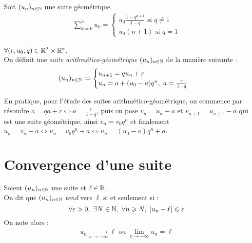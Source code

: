 \begin{proposition}
    Soit $(u_n)_{n \in \mathbb{N}}$ une suite géométrique.
    \begin{align*}
        \sum_{k = 0}^{n} u_k = 
        \begin{cases}
            u_0 \frac{1 - q^{n+1}}{1 - q} \text{ si } q \neq 1\\
            u_0(n+1) \text{ si } q = 1
        \end{cases}
    \end{align*}
\end{proposition}

\begin{definition}
    $\forall (r, u_0, q) \in \mathbb{R}^2 \times \mathbb{R}^*$. 
    \\
    On définit une \emph{suite arithmético-géométrique} $(u_n)_{n \in \mathbb{N}}$ de la manière suivante :
    \begin{align*}
        (u_n)_{n \in \mathbb{N}} \coloneqq 
        \begin{cases}
            u_{n+1} = qu_n + r \\ 
            u_n = a + (u_0 - a) q^n,\ a = \frac{r}{1 - q}
        \end{cases}
    \end{align*}
\end{definition}

En pratique, pour l'étude des suites arithmético-géométrique, on commence par résoudre $a = qa + r \iff a = \frac{r}{1 - q}$, puis on pose $v_n = u_n - a$ et $v_{n+1} = u_{n+1} - a$ qui est une suite géométrique, ainsi $v_n = v_0 q^n$ et finalement $u_n = v_n + a \iff u_n = v_0 q^n + a \iff u_n = (u_0 - a) q^n + a$.

\section{Convergence d'une suite}
\begin{definition}
    Soient $(u_n)_{n \in \mathbb{N}}$ une suite et $\ell \in \mathbb{R}$. 
    \\
    On dit que $(u_n)_{n \in \mathbb{N}}$ \emph{tend} vers $\ell$ si et seulement si :
    \[ \forall \varepsilon > 0,\ \exists N \in \mathbb{N},\ \forall n \geqslant N,\ \abs{u_n - \ell} \leqslant \varepsilon \]
    On note alors :
    \begin{align*}
        u_n \xrightarrow[n \to +\infty]{} \ell \text{ ou } \lim_{n \to +\infty} u_n = \ell
    \end{align*}
\end{definition}


